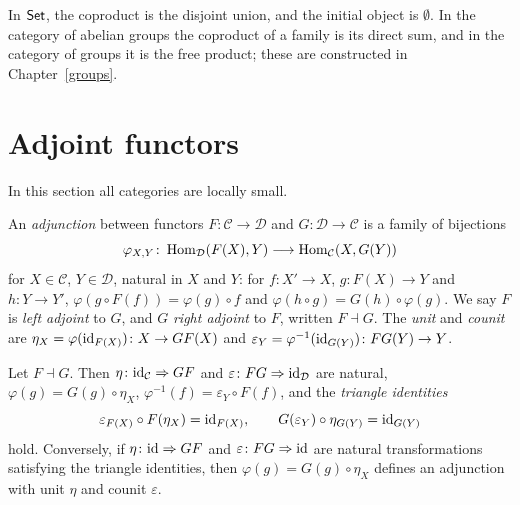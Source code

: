 \begin{example}\label{categories:example-colimits}
In $\mathsf{Set}$, the coproduct is the disjoint union, and the initial object is
$\emptyset$. In the category of abelian groups the coproduct of a family is its
direct sum, and in the category of groups it is the free product; these are
constructed in Chapter~\ref{groups}.
\end{example}

\section{Adjoint functors}\label{categories:section-adjunctions}

In this section all categories are locally small.

\begin{definition}\label{categories:definition-adjunction}
An \emph{adjunction} between functors $F \colon \mathcal{C} \to \mathcal{D}$ and
$G \colon \mathcal{D} \to \mathcal{C}$ is a family of bijections
\[
\varphi_{X,Y} \colon \operatorname{Hom}_{\mathcal{D}}(F(X), Y) \longrightarrow \operatorname{Hom}_{\mathcal{C}}(X, G(Y))
\]
for $X \in \mathcal{C}$, $Y \in \mathcal{D}$, natural in $X$ and $Y$: for
$f \colon X' \to X$, $g \colon F(X) \to Y$ and $h \colon Y \to Y'$,
$\varphi(g \circ F(f)) = \varphi(g) \circ f$ and $\varphi(h \circ g) = G(h) \circ \varphi(g)$.
We say $F$ is \emph{left adjoint} to $G$, and $G$ \emph{right adjoint} to $F$,
written $F \dashv G$. The \emph{unit} and \emph{counit} are
$\eta_X = \varphi(\mathrm{id}_{F(X)}) \colon X \to GF(X)$ and
$\varepsilon_Y = \varphi^{-1}(\mathrm{id}_{G(Y)}) \colon FG(Y) \to Y$.
\end{definition}

\begin{proposition}\label{categories:proposition-unit-counit}
Let $F \dashv G$. Then $\eta \colon \mathrm{id}_{\mathcal{C}} \Rightarrow GF$ and
$\varepsilon \colon FG \Rightarrow \mathrm{id}_{\mathcal{D}}$ are natural, $\varphi(g) = G(g) \circ \eta_X$,
$\varphi^{-1}(f) = \varepsilon_Y \circ F(f)$, and the \emph{triangle identities}
\[
\varepsilon_{F(X)} \circ F(\eta_X) = \mathrm{id}_{F(X)}, \qquad
G(\varepsilon_Y) \circ \eta_{G(Y)} = \mathrm{id}_{G(Y)}
\]
hold. Conversely, if $\eta \colon \mathrm{id} \Rightarrow GF$ and $\varepsilon \colon FG \Rightarrow \mathrm{id}$
are natural transformations satisfying the triangle identities, then
$\varphi(g) = G(g) \circ \eta_X$ defines an adjunction with unit $\eta$ and counit
$\varepsilon$.
\end{proposition}

